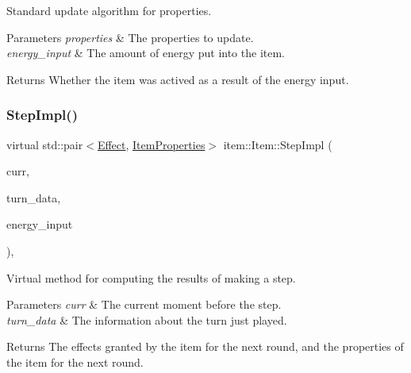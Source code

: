 Standard update algorithm for properties. 


\begin{DoxyParams}{Parameters}
{\em properties} & The properties to update. \\
\hline
{\em energy\+\_\+input} & The amount of energy put into the item. \\
\hline
\end{DoxyParams}
\begin{DoxyReturn}{Returns}
Whether the item was actived as a result of the energy input. 
\end{DoxyReturn}
\mbox{\label{classitem_1_1_item_a90df61c8a2a20144eb1100af5fb2d464}} 
\subsubsection{\texorpdfstring{Step\+Impl()}{StepImpl()}}
{\footnotesize\ttfamily virtual std\+::pair$<$\hyperlink{classitem_1_1_effect}{Effect}, \hyperlink{classitem_1_1_item_properties}{Item\+Properties}$>$ item\+::\+Item\+::\+Step\+Impl (\begin{DoxyParamCaption}\item[{\hyperlink{classtimeplane_1_1_moment}{Moment}}]{curr,  }\item[{\hyperlink{classroundinfo_1_1_round_info_view}{Round\+Info\+View} const \&}]{turn\+\_\+data,  }\item[{int}]{energy\+\_\+input }\end{DoxyParamCaption})\hspace{0.3cm}{\ttfamily [protected]}, {}}



Virtual method for computing the results of making a step. 


\begin{DoxyParams}{Parameters}
{\em curr} & The current moment before the step. \\
\hline
{\em turn\+\_\+data} & The information about the turn just played. \\
\hline
\end{DoxyParams}
\begin{DoxyReturn}{Returns}
The effects granted by the item for the next round, and the properties of the item for the next round. 
\end{DoxyReturn}


